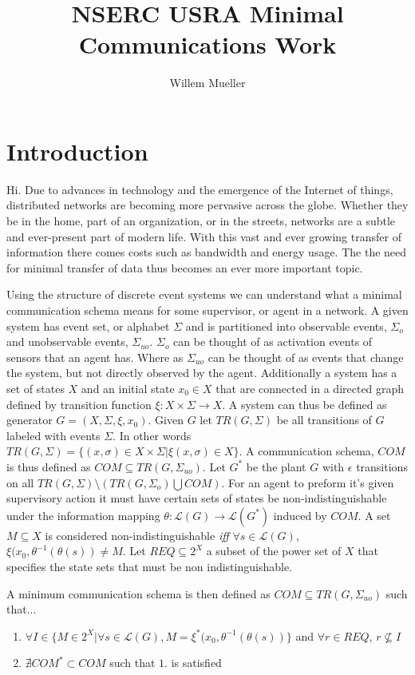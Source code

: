 \documentclass{article}
\title{NSERC USRA Minimal Communications Work}
\author{Willem Mueller}
\begin{document}
	\maketitle

	\section{Introduction}

		Hi. Due to advances in technology and the emergence of the Internet of things, distributed networks are becoming more pervasive across the globe. Whether they be in the home, part of an organization, or in the streets, networks are a subtle and ever-present part of modern life. With this vast and ever growing transfer of information there comes costs such as bandwidth and energy usage. The the need for minimal transfer of data thus becomes an ever more important topic. 

		Using the structure of discrete event systems we can understand what a minimal communication schema means for some supervisor, or agent in a network. A given system has event set, or alphabet $\Sigma$ and is partitioned into observable events, $\Sigma_o$ and unobservable events, $\Sigma_{uo}$. $\Sigma_o$ can be thought of as activation events of sensors that an agent has. Where as $\Sigma_{uo}$ can be thought of as events that change the system, but not directly observed by the agent. Additionally a system has a set of states $X$ and an initial state $x_0 \in X$ that are connected in a directed graph defined by transition function $\xi : X \times \Sigma \to X$. A system can thus be defined as generator $G = (X, \Sigma, \xi, x_0)$. Given $G$ let $TR(G,\Sigma)$ be all transitions of $G$ labeled with events $\Sigma$. In other words $TR(G,\Sigma) = \{(x, \sigma)\in X\times\Sigma | \xi(x, \sigma) \in X\}$. A communication schema, $COM$ is thus defined as $COM \subseteq TR(G, \Sigma_{uo})$. Let $G^*$ be the plant $G$ with $\epsilon$ transitions on all $TR(G, \Sigma)\setminus (TR(G, \Sigma_o) \bigcup COM)$. For an agent to preform it's given supervisory action it must have certain sets of states be non-indistinguishable under the information mapping $\theta : \mathcal{L}(G) \to \mathcal{L}(G^*)$ induced by $COM$. A set $M\subseteq X$ is considered non-indistinguishable \emph{iff} $\forall s \in \mathcal{L}(G)$, $\xi(x_0, \theta^{-1}(\theta(s)) \neq M$. Let $REQ \subseteq 2^X$ a subset of the power set of $X$ that specifies the state sets that must be non indistinguishable. 

		A minimum communication schema is then defined as $COM \subseteq TR(G, \Sigma_{uo})$ such that...
		\begin{enumerate}
			\item $\forall I\in\{M \in 2^X | \forall s \in \mathcal{L}(G), M = \xi^*(x_0, \theta^{-1}(\theta(s))\} $ and $ \forall r\in REQ$, $ r\nsubseteq I$
			\item $\nexists COM^* \subset COM$ such that $1.$ is satisfied
		\end{enumerate}
\end{document}
